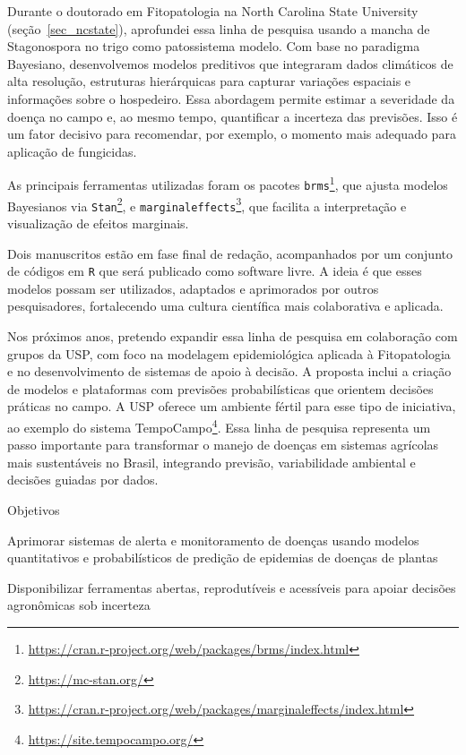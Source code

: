 \documentclass[12pt,a4paper,oneside]{book}
\newcommand{\NCState}{North Carolina State University}
\begin{document}
Durante o doutorado em Fitopatologia na \NCState{} (seção~\ref{sec_ncstate}), aprofundei essa linha de 
pesquisa usando a mancha de Stagonospora no trigo como patossistema modelo. Com base no paradigma 
Bayesiano, desenvolvemos modelos preditivos que integraram dados climáticos de alta resolução, 
estruturas hierárquicas para capturar variações espaciais e informações sobre o hospedeiro. Essa 
abordagem permite estimar a severidade da doença no campo e, ao mesmo tempo, quantificar a 
incerteza das previsões. Isso é um fator decisivo para recomendar, por exemplo, o momento mais adequado para aplicação de fungicidas.

As principais ferramentas utilizadas foram os pacotes
\texttt{brms}\footnote{\url{https://cran.r-project.org/web/packages/brms/index.html}}, que ajusta modelos
Bayesianos via \texttt{Stan}\footnote{\url{https://mc-stan.org/}}, e
\texttt{marginaleffects}\footnote{\url{https://cran.r-project.org/web/packages/marginaleffects/index.html}}, que facilita a 
interpretação e visualização de efeitos marginais.

Dois manuscritos estão em fase final de redação, acompanhados por um conjunto de códigos em \texttt{R} que será 
publicado como software livre. A ideia é que esses modelos possam ser utilizados, adaptados e 
aprimorados por outros pesquisadores, fortalecendo uma cultura científica mais colaborativa e aplicada.

Nos próximos anos, pretendo expandir essa linha de pesquisa em colaboração com grupos da USP, 
com foco na modelagem epidemiológica aplicada à Fitopatologia e no desenvolvimento de sistemas de 
apoio à decisão. A proposta inclui a criação de modelos e plataformas com previsões probabilísticas 
que orientem decisões práticas no campo. A USP oferece um ambiente fértil para esse tipo de iniciativa, 
ao exemplo do sistema TempoCampo\footnote{\url{https://site.tempocampo.org/}}. Essa 
linha de pesquisa representa um passo importante para transformar o manejo de doenças em sistemas agrícolas mais 
sustentáveis no Brasil, integrando previsão, variabilidade ambiental e decisões guiadas por dados.
  
\begin{fancyenum}{\faBullseye}{Objetivos}
\item Aprimorar sistemas de alerta e monitoramento de doenças usando modelos quantitativos e probabilísticos de predição 
  de epidemias de doenças de plantas
 \item Disponibilizar ferramentas abertas, reprodutíveis e acessíveis para apoiar decisões agronômicas sob incerteza
\end{fancyenum}
  
\end{document}
